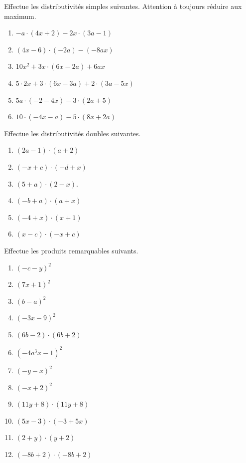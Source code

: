 \documentclass[12pt,parskip=half-, twoside=semi]{scrartcl}
\begin{document}
\begin{exercise}Effectue les distributivités simples suivantes. Attention à toujours réduire aux maximum.
  \begin{enumerate}[cols=2]
    \item $-a \cdot(4 x+2)-2 x \cdot(3 a-1)$
    \item $(4 x-6) \cdot(-2 a)-(-8 a x)$
    \item $10 x^2+3 x \cdot(6 x-2 a)+6 a x$
    \item $5 \cdot 2 x+3 \cdot(6 x-3 a)+2 \cdot(3 a-5 x)$
    \item $5 a \cdot(-2-4 x)-3 \cdot(2 a+5)$
    \item $10 \cdot(-4 x-a)-5 \cdot(8 x+2 a)$
  \end{enumerate}
\end{exercise}

\begin{exercise}Effectue les distributivités doubles suivantes.
  \begin{enumerate}[cols=3]
    \item $(2 a-1) \cdot(a+2)$
    \item $(-x+c) \cdot(-d+x)$
    \item $(5+a) \cdot(2-x)$.
    \item $(-b+a) \cdot(a+x)$
    \item $(-4+x) \cdot(x+1)$
    \item $(x-c) \cdot(-x+c)$
  \end{enumerate}
\end{exercise}

\begin{exercise}Effectue les produits remarquables suivants.
  \begin{enumerate}[cols=3]
      \item $(-c-y)^2$
      \item $(7 x+1)^2$
      \item $(b-a)^2$
      \item $(-3 x-9)^2$
      \item $(6 b-2) \cdot(6 b+2)$
      \item $\left(-4 a^3 x-1\right)^2$
      \item $(-y-x)^2$
      \item $(-x+2)^2$
      \item $(11 y+8) \cdot(11 y+8)$
      \item $(5 x-3) \cdot(-3+5 x)$
      \item $(2+y) \cdot(y+2)$
      \item $(-8 b+2) \cdot(-8 b+2)$
  \end{enumerate}
\end{exercise}
\end{document}
